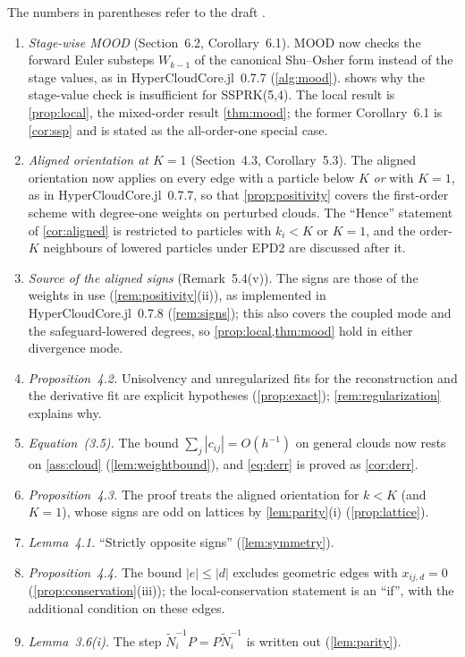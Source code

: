 \documentclass[11pt,a4paper]{article}
\theoremstyle{plain}
\theoremstyle{definition}
\theoremstyle{remark}
\numberwithin{equation}{section}
\newcommand{\Ntil}{\tilde N}
\begin{document}
The numbers in parentheses refer to the draft \cite{JungMUSCL2026draft}.
\begin{enumerate}
\item \emph{Stage-wise MOOD} (Section~6.2, Corollary~6.1). MOOD now checks the forward Euler substeps $W_{k-1}$ of the canonical Shu--Osher form instead of the stage values, as in HyperCloudCore.jl~0.7.7 (\cref{alg:mood}).  shows why the stage-value check is insufficient for SSPRK(5,4). The local result is \cref{prop:local}, the mixed-order result \cref{thm:mood}; the former Corollary~6.1 is \cref{cor:ssp} and is stated as the all-order-one special case.
\item \emph{Aligned orientation at $K=1$} (Section~4.3, Corollary~5.3). The aligned orientation now applies on every edge with a particle below $K$ \emph{or} with $K=1$, as in HyperCloudCore.jl~0.7.7, so that \cref{prop:positivity} covers the first-order scheme with degree-one weights on perturbed clouds. The ``Hence'' statement of \cref{cor:aligned} is restricted to particles with $k_i<K$ or $K=1$, and the order-$K$ neighbours of lowered particles under EPD2 are discussed after it.
\item \emph{Source of the aligned signs} (Remark~5.4(v)). The signs are those of the weights in use (\cref{rem:positivity}(ii)), as implemented in HyperCloudCore.jl~0.7.8 (\cref{rem:signs}); this also covers the coupled mode and the safeguard-lowered degrees, so \cref{prop:local,thm:mood} hold in either divergence mode.
\item \emph{Proposition~4.2.} Unisolvency and unregularized fits for the reconstruction and the derivative fit are explicit hypotheses (\cref{prop:exact}); \cref{rem:regularization} explains why.
\item \emph{Equation~(3.5).} The bound $\sum_j|c_{ij}|=O(h^{-1})$ on general clouds now rests on \cref{ass:cloud} (\cref{lem:weightbound}), and \eqref{eq:derr} is proved as \cref{cor:derr}.
\item \emph{Proposition~4.3.} The proof treats the aligned orientation for $k<K$ (and $K=1$), whose signs are odd on lattices by \cref{lem:parity}(i) (\cref{prop:lattice}).
\item \emph{Lemma~4.1.} ``Strictly opposite signs'' (\cref{lem:symmetry}).
\item \emph{Proposition~4.4.} The bound $|e|\le|d|$ excludes geometric edges with $x_{ij,d}=0$ (\cref{prop:conservation}(iii)); the local-conservation statement is an ``if'', with the additional condition on these edges.
\item \emph{Lemma~3.6(i).} The step $\Ntil_i^{-1}P=P\Ntil_i^{-1}$ is written out (\cref{lem:parity}).

\end{enumerate}
\end{document}
